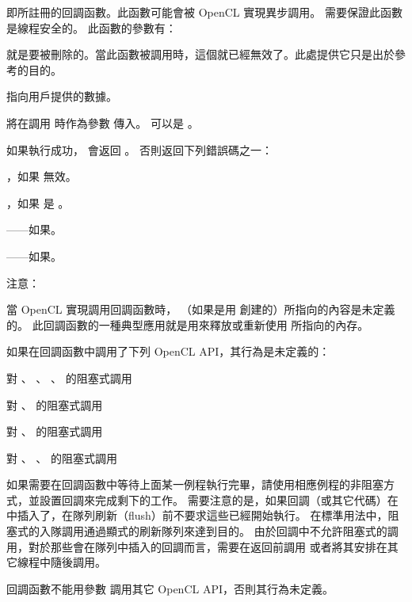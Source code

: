  即所註冊的回調函數。此函數可能會被 OpenCL 實現異步調用。
需要保證此函數是線程安全的。
此函數的參數有：
\startigBase
\item {} 就是要被刪除的。當此函數被調用時，這個就已經無效了。此處提供它只是出於參考的目的。

\item {} 指向用戶提供的數據。
\stopigBase

 將在調用  時作為參數  傳入。
  可以是 。

如果執行成功，  會返回 。
否則返回下列錯誤碼之一：
\startigBase
\item {}，如果  無效。

\item {}，如果  是 。

\item {}——如果\scdevfailres。

\item {}——如果\schostfailres。
\stopigBase

注意：

當 OpenCL 實現調用回調函數時，  （如果是用  創建的）所指向的內容是未定義的。
此回調函數的一種典型應用就是用來釋放或重新使用  所指向的內存。

如果在回調函數中調用了下列 OpenCL API，其行為是未定義的：
\startigBase
\item {}
\item {}
\item 對 、 、 、  的阻塞式調用
\item 對 、  的阻塞式調用
\item 對 、  的阻塞式調用
\item 對 、 、  的阻塞式調用
\stopigBase

如果需要在回調函數中等待上面某一例程執行完畢，請使用相應例程的非阻塞方式，並設置回調來完成剩下的工作。
需要注意的是，如果回調（或其它代碼）在中插入了，在隊列刷新（flush）前不要求這些已經開始執行。
在標準用法中，阻塞式的入隊調用通過顯式的刷新隊列來達到目的。
由於回調中不允許阻塞式的調用，對於那些會在隊列中插入的回調而言，需要在返回前調用  或者將其安排在其它線程中隨後調用。

回調函數不能用參數  調用其它 OpenCL API，否則其行為未定義。

